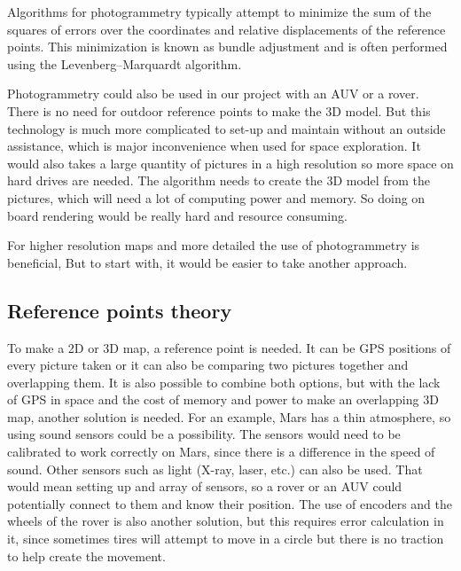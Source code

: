 Algorithms for photogrammetry typically attempt to minimize the sum of the squares of errors over the coordinates and relative displacements of the reference points. This minimization is known as bundle adjustment and is often performed using the Levenberg–Marquardt algorithm\cite{photo}.

Photogrammetry could also be used in our project with an AUV or a rover. There is no need for outdoor reference points to make the 3D model. But this technology is much more complicated to set-up and maintain without an outside assistance, which is major inconvenience when used for space exploration. It would also takes a large quantity of pictures in a high resolution so more space on hard drives are needed. The algorithm needs to create the 3D model from the pictures, which will need a lot of computing power and memory. So doing on board rendering would be really hard and resource consuming.

For higher resolution maps and more detailed the use of photogrammetry is beneficial, But to start with, it would be easier to take another approach. %

\subsection{Reference points theory}

To make a 2D or 3D map, a reference point is needed. It can be GPS positions of every picture taken or it can also be comparing two pictures together and overlapping them. It is also possible to combine both options, but with the lack of GPS in space and the cost of memory and power to make an overlapping 3D map, another solution is needed. For an example, Mars has a thin atmosphere, so using sound sensors could be a possibility. The sensors would need to be calibrated to work correctly on Mars, since there is a difference in the speed of sound. Other sensors such as light (X-ray, laser, etc.) can also be used. That would mean setting up and array of sensors, so a rover or an AUV could potentially connect to them and know their position. The use of encoders and the wheels of the rover is also another solution, but this requires error calculation in it, since sometimes tires will attempt to move in a circle but there is no traction to help create the movement\cite{reference}.


